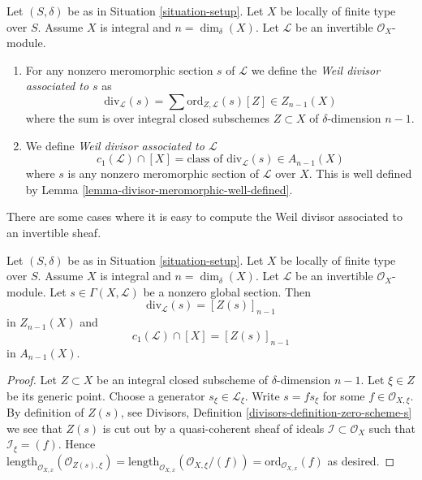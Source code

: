 \begin{definition}
\label{definition-divisor-invertible-sheaf}
Let $(S, \delta)$ be as in Situation \ref{situation-setup}.
Let $X$ be locally of finite type over $S$. Assume $X$ is
integral and $n = \dim_\delta(X)$.
Let $\mathcal{L}$ be an invertible $\mathcal{O}_X$-module.
\begin{enumerate}
\item For any nonzero meromorphic section $s$ of $\mathcal{L}$
we define the {\it Weil divisor associated to $s$} as
$$
\text{div}_\mathcal{L}(s) =
\sum \text{ord}_{Z, \mathcal{L}}(s) [Z] \in Z_{n - 1}(X)
$$
where the sum is over integral closed subschemes $Z \subset X$
of $\delta$-dimension $n - 1$.
\item We define {\it Weil divisor associated to $\mathcal{L}$}
$$
c_1(\mathcal{L}) \cap [X] =
\text{class of }\text{div}_\mathcal{L}(s) \in A_{n - 1}(X)
$$
where $s$ is any nonzero meromorphic section of $\mathcal{L}$ over
$X$. This is well defined by
Lemma \ref{lemma-divisor-meromorphic-well-defined}.
\end{enumerate}
\end{definition}

\noindent
There are some cases where it is easy to compute the
Weil divisor associated to an invertible sheaf.

\begin{lemma}
\label{lemma-compute-c1}
Let $(S, \delta)$ be as in Situation \ref{situation-setup}.
Let $X$ be locally of finite type over $S$. Assume $X$ is
integral and $n = \dim_\delta(X)$.
Let $\mathcal{L}$ be an invertible $\mathcal{O}_X$-module.
Let $s \in \Gamma(X, \mathcal{L})$ be a nonzero global section.
Then
$$
\text{div}_\mathcal{L}(s) = [Z(s)]_{n - 1}
$$
in $Z_{n - 1}(X)$ and
$$
c_1(\mathcal{L}) \cap [X] = [Z(s)]_{n - 1}
$$
in $A_{n - 1}(X)$.
\end{lemma}

\begin{proof}
Let $Z \subset X$ be an integral closed subscheme of
$\delta$-dimension $n - 1$. Let $\xi \in Z$ be its generic
point. Choose a generator $s_\xi \in \mathcal{L}_\xi$.
Write $s = fs_\xi$ for some $f \in \mathcal{O}_{X, \xi}$.
By definition of $Z(s)$, see
Divisors, Definition \ref{divisors-definition-zero-scheme-s}
we see that $Z(s)$ is cut out by a quasi-coherent
sheaf of ideals $\mathcal{I} \subset \mathcal{O}_X$ such
that $\mathcal{I}_\xi = (f)$. Hence
$\text{length}_{\mathcal{O}_{X, x}}(\mathcal{O}_{Z(s), \xi})
=
\text{length}_{\mathcal{O}_{X, x}}(\mathcal{O}_{X, \xi}/(f))
=
\text{ord}_{\mathcal{O}_{X, x}}(f)$ as desired.
\end{proof}


